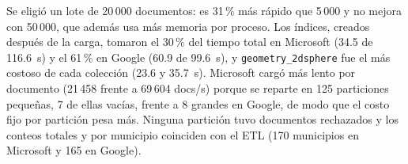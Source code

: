 Se eligió un lote de 20\,000 documentos: es 31\,\% más rápido que 5\,000 y no mejora con 50\,000, que además usa más memoria por proceso. Los índices, creados después de la carga, tomaron el 30\,\% del tiempo total en Microsoft (34.5 de 116.6~s) y el 61\,\% en Google (60.9 de 99.6~s), y \texttt{geometry\_2dsphere} fue el más costoso de cada colección (23.6 y 35.7~s). Microsoft cargó más lento por documento (21\,458 frente a 69\,604 docs/s) porque se reparte en 125 particiones pequeñas, 7 de ellas vacías, frente a 8 grandes en Google, de modo que el costo fijo por partición pesa más. Ninguna partición tuvo documentos rechazados y los conteos totales y por municipio coinciden con el ETL (170 municipios en Microsoft y 165 en Google).
